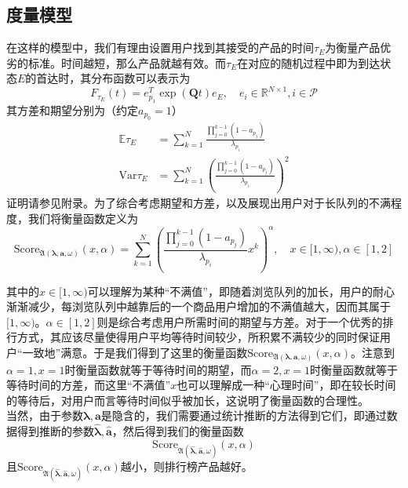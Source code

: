 \documentclass[UTF8]{ctexart}
\theoremstyle{plain}
\theoremstyle{definition}
\theoremstyle{remark}
\begin{document}
	\subsection{度量模型}
	在这样的模型中，我们有理由设置用户找到其接受的产品的时间$\tau_E$为衡量产品优劣的标准。时间越短，那么产品就越有效。而$\tau_E$在对应的随机过程中即为到达状态$E$的首达时，其分布函数可以表示为
	$$
	F_{\tau_E}(t) = e_{p_1}^T \exp(\bm{Q}t)e_{E}, \quad e_i \in \mathbb{R}^{N \times 1}, i \in \mathcal{P}
	$$
	其方差和期望分别为（约定$a_{p_0} = 1$）
	\begin{equation} \label{EQ_A}
	\begin{aligned}
	\mathbb{E} \tau_E & = \sum_{k=1}^N \frac{\prod\limits_{j=0}^{k-1}(1-a_{p_j})}{\lambda_{p_i}} \\
	\mathrm{Var} \tau_E & = \sum_{k=1}^N \left(\frac{\prod\limits_{j=0}^{k-1}(1-a_{p_j})}{\lambda_{p_i}}\right)^2
	\end{aligned}
	\end{equation}
	证明请参见附录。为了综合考虑期望和方差，以及展现出用户对于长队列的不满程度，我们将衡量函数定义为
	\begin{equation}
	\mathrm{Score}_{\mathfrak{A}\left(\bm{\lambda}, \bm{a}, \omega\right)}(x, \alpha) =  \sum_{k=1}^N \left(\frac{\prod\limits_{j=0}^{k-1}(1-a_{p_j})}{\lambda_{p_i}} x^k\right)^\alpha, \quad x \in [1, \infty), \alpha \in [1,2]
	\end{equation}
	
	其中的$x \in [1, \infty)$可以理解为某种“不满值”，即随着浏览队列的加长，用户的耐心渐渐减少，每浏览队列中越靠后的一个商品用户增加的不满值越大，因而其属于$[1, \infty)$。$\alpha \in [1,2]$则是综合考虑用户所需时间的期望与方差。对于一个优秀的排行方式，其应该尽量使得用户平均等待时间较少，所积累不满较少的同时保证用户“一致地”满意。于是我们得到了这里的衡量函数$\mathrm{Score}_{\mathfrak{A}\left(\bm{\lambda}, \bm{a}, \omega\right)}(x, \alpha)$。注意到$\alpha = 1, x = 1$时衡量函数就等于等待时间的期望，而$\alpha = 2, x = 1$时衡量函数就等于等待时间的方差，而这里“不满值”$x$也可以理解成一种“心理时间”，即在较长时间的等待后，对用户而言等待时间似乎被加长，这说明了衡量函数的合理性。 \\
	
	当然，由于参数$\bm{\lambda}, \bm{a}$是隐含的，我们需要通过统计推断的方法得到它们，即通过数据得到推断的参数$\bm{\hat{\lambda}}, \bm{\hat{a}}$，然后得到我们的衡量函数
	$$
	\mathrm{Score}_{\mathfrak{A}\left(\bm{\hat{\lambda}}, \bm{\hat{a}}, \omega\right)}(x, \alpha)
	$$
	且$\mathrm{Score}_{\mathfrak{A}\left(\bm{\hat{\lambda}}, \bm{\hat{a}}, \omega\right)}(x, \alpha)$越小，则排行榜产品越好。
\end{document}
